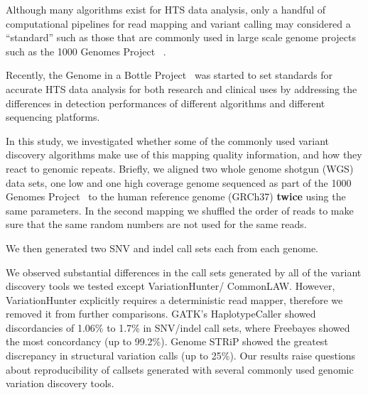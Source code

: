\documentclass{bioinfo}
\newcommand{\junk}[1]{}
\begin{document}
 Although many algorithms exist for HTS data analysis, only a handful of computational pipelines for read mapping and variant calling may considered a ``standard'' such as those that are commonly used in large scale genome projects such as the 1000 Genomes Project
~\citep{1000GP2015}. 
\junk {For example, to discover and genotype variants using Illumina data, first the reads are mapped to reference genome assembly using BWA-MEM~\citep{Li2013}, Bowtie~\citep{Langmead2009}, or a similar tool~\citep{Alkan2009,Weese2012} then the alignment files are processed using SAMtools~\citep{Li2009b} and Picard\footnote{\href{http://broadinstitute.github.io/picard/}{http://broadinstitute.github.io/picard/}}, and finally the single nucleotide variants (SNV) and indels are predicted and filtered using GATK~\citep{DePristo2011}, Platypus~\citep{Rimmer2014}, or Freebayes~\citep{Garrison2012}. 
Structural variation (SV) discovery is even more challenging as exemplified by the 1000 Genomes Project~\citep{1000GP2015,Mills2011}, where more than 20 algorithms were used to characterize SVs.
} 
Recently, the Genome in a Bottle Project~\citep{Zook2014} was started to set standards for accurate HTS data analysis for both research and clinical uses by addressing the differences in detection performances 
of different algorithms and different sequencing platforms.

In this study, we investigated whether some of the commonly used variant discovery algorithms
make use of this mapping quality information, and how they react to genomic repeats.
Briefly, 
we aligned two whole genome shotgun (WGS) data sets, one low and one high coverage genome
sequenced as part of the 1000 Genomes Project~\citep{1000GP2015} to the human reference genome (GRCh37) {\bf twice} using the same parameters. 
In the second mapping 
we shuffled the order of reads  to make sure that the same random numbers are not used for the same reads. 
\junk{ In a small scale test, we did not observe any differences
in the alignment files when we used deterministic aligners such as Bowtie~\citep{Langmead2009} and mrFAST~\citep{Alkan2009};
however, 
the map locations reported by BWA-MEM in repetitive regions differed among replications ($\sim$2.1\% of reads) as expected due to its random placement strategy.}
We then generated two SNV and indel call sets each from each genome.

We observed substantial differences in the call sets generated by all of the variant discovery tools we tested except VariationHunter/ CommonLAW. However, VariationHunter explicitly requires
 a deterministic read mapper, therefore we removed it from further comparisons. GATK's HaplotypeCaller showed discordancies of 1.06\% to 1.7\% in SNV/indel call sets,
 where Freebayes showed the most concordancy (up to 99.2\%). Genome STRiP showed the greatest discrepancy in structural variation calls (up to 25\%).
Our results raise questions about reproducibility of callsets generated with several commonly used genomic variation discovery tools.
\end{document}
